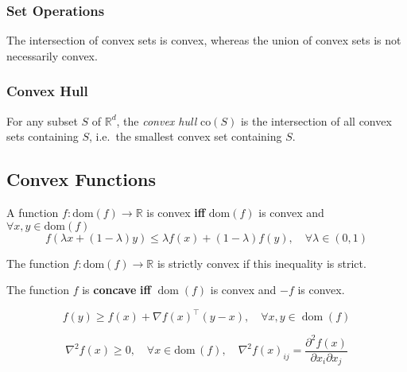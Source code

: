 \subsubsection{Set Operations}
The intersection of convex sets is convex, whereas the union of convex sets is not necessarily convex.

\subsubsection{Convex Hull}\label{ssec:convex_hull}
For any subset $S$ of $\mathbb{R}^d$, the \textit{convex hull} $\mathrm{co}(S)$ is the intersection of all convex sets containing $S$, i.e.\ the smallest convex set containing $S$.



\subsection{Convex Functions}
A function $f:\text{dom}(f) \rightarrow \mathbb{R}$ is convex \textbf{iff} $\text{dom}(f)$ is convex and $\forall x,y \in \text{dom}(f)$
\begin{equation*}
    f(\lambda x + (1-\lambda)y) \leq \lambda f(x) + (1-\lambda)f(y),\quad \forall \lambda \in (0,1)
\end{equation*}

\newpar{}
The function $f:\text{dom}(f) \rightarrow \mathbb{R}$ is strictly convex if this inequality is strict.

\newpar{}
The function $f$ is \textbf{concave} \textbf{iff} $\operatorname{dom}(f)$ is convex and $-f$ is convex.

\newpar{}
\begin{equation*}
    f(y) \geq f(x) + \nabla {f(x)}^{\top}(y-x), \quad \forall x, y \in \operatorname{dom}(f)
\end{equation*}

\newpar{}
\begin{equation*}
    \nabla^2 f(x) \geq 0, \quad \forall x \in \text{dom}\,(f), \quad \nabla^2 {f(x)}_{ij} = \frac{\partial^2 f(x)}{\partial x_i \partial x_j}
\end{equation*}

